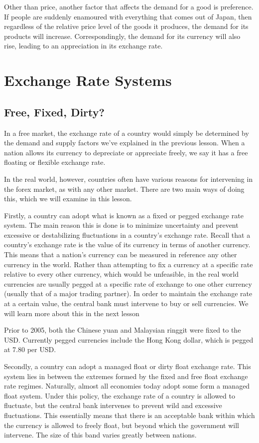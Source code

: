 \documentclass[DIV=calc,11pt,parskip,numbers=noenddot]{scrartcl} %
\begin{document}
Other than price, another factor that affects the demand for a good is preference. If people are suddenly enamoured with everything that comes out of Japan, then regardless of the relative price level of the goods it produces, the demand for its products will increase. Correspondingly, the demand for its currency will also rise, leading to an appreciation in its exchange rate.
\newpage
\section{Exchange Rate Systems}
\subsection{Free, Fixed, Dirty?}
In a free market, the exchange rate of a country would simply be determined by the demand and supply factors we’ve explained in the previous lesson. When a nation allows its currency to depreciate or appreciate freely, we say it has a free floating or flexible exchange rate.

In the real world, however, countries often have various reasons for intervening in the forex market, as with any other market. There are two main ways of doing this, which we will examine in this lesson.

Firstly, a country can adopt what is known as a fixed or pegged exchange rate system. The main reason this is done is to minimize uncertainty and prevent excessive or destabilizing fluctuations in a country’s exchange rate. Recall that a country’s exchange rate is the value of its currency in terms of another currency. This means that a nation’s currency can be measured in reference any other currency in the world. Rather than attempting to fix a currency at a specific rate relative to every other currency, which would be unfeasible, in the real world currencies are usually pegged at a specific rate of exchange to one other currency (usually that of a major trading partner).  In order to maintain the exchange rate at a certain value, the central bank must intervene to buy or sell currencies. We will learn more about this in the next lesson

Prior to 2005, both the Chinese yuan and Malaysian ringgit were fixed to the USD. Currently pegged currencies include the Hong Kong dollar, which is pegged at 7.80 per USD.

Secondly, a country can adopt a managed float or dirty float exchange rate. This system lies in between the extremes formed by the fixed and free float exchange rate regimes. Naturally, almost all economies today adopt some form a managed float system.  Under this policy, the exchange rate of a country is allowed to fluctuate, but the central bank intervenes to prevent wild and excessive fluctuations. This essentially means that there is an acceptable bank within which the currency is allowed to freely float, but beyond which the government will intervene. The size of this band varies greatly between nations.
\end{document}
